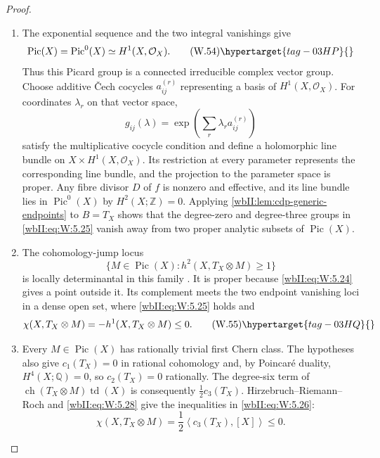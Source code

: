 \begin{proof}

\begin{enumerate}[label=\arabic*.,leftmargin=*]
\item The exponential sequence and the two integral vanishings give
\[
 \operatorname{Pic}(X)=\operatorname{Pic}^0(X)
 \simeq H^1(X,\mathcal O_X).
\tag{W.54}\hypertarget{tag-03HP}{}\label{wbII:eq:W:5.27}
\]
Thus this Picard group is a connected irreducible complex vector group.
Choose additive \v{C}ech cocycles $a^{(r)}_{ij}$ representing a basis of
$H^1(X,\mathcal O_X)$. For coordinates $\lambda_r$ on that vector space,
\[
 g_{ij}(\lambda)=\exp\!\left(\sum_r\lambda_r a^{(r)}_{ij}\right)
\]
satisfy the multiplicative cocycle condition and define a holomorphic
line bundle on $X\times H^1(X,\mathcal O_X)$. Its restriction at every
parameter represents the corresponding line bundle, and the projection to the parameter space is proper.  Any fibre divisor \(D\) of
\(f\) is nonzero and effective, and its line bundle lies in
\(\operatorname{Pic}^0(X)\) by \(H^2(X;\mathbb Z)=0\).  Applying
\cref{wbII:lem:cdp-generic-endpoints} to \(B=T_X\) shows that the degree-zero and
degree-three groups in \eqref{wbII:eq:W:5.25} vanish away from two proper analytic subsets
of \(\operatorname{Pic}(X)\).

\item The cohomology-jump locus
\[
 \{M\in\operatorname{Pic}(X):h^2(X,T_X\otimes M)\ge1\}
\]
is locally determinantal in this family
\cite[Chapter~III, \S4, Theorem~4.1, p.~124]{BS76push}.  It is proper because \eqref{wbII:eq:W:5.24} gives a
point outside it.  Its complement meets the two endpoint
vanishing loci in a dense open set, where \eqref{wbII:eq:W:5.25} holds and
\[
 \chi(X,T_X\otimes M)=-h^1(X,T_X\otimes M)\le0.
\tag{W.55}\hypertarget{tag-03HQ}{}\label{wbII:eq:W:5.28}
\]

\item Every \(M\in\operatorname{Pic}(X)\) has rationally trivial first Chern
class.  The hypotheses also give \(c_1(T_X)=0\) in rational cohomology and,
by Poincar\'e duality, \(H^4(X;\mathbb Q)=0\), so
\(c_2(T_X)=0\) rationally.  The degree-six term of
\(\operatorname{ch}(T_X\otimes M)\operatorname{td}(X)\) is consequently
\(\tfrac12c_3(T_X)\).  Hirzebruch--Riemann--Roch and \eqref{wbII:eq:W:5.28} give the inequalities
in \eqref{wbII:eq:W:5.26}:
\[
 \chi(X,T_X\otimes M)
 =\frac12\left\langle c_3(T_X),[X]\right\rangle\le0.
\]

\end{enumerate}
\end{proof}